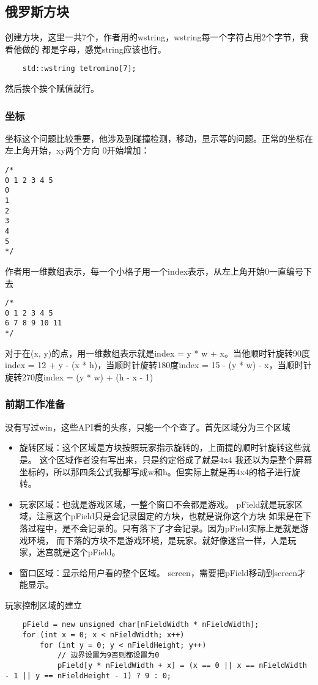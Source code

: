 \documentclass{article}
\begin{document}
\begin{sloppypar}
\subsection{俄罗斯方块}
创建方块，这里一共7个，作者用的wstring，wstring每一个字符占用2个字节，我看他做的
都是字母，感觉string应该也行。
\begin{lstlisting}
	std::wstring tetromino[7];
\end{lstlisting}
然后挨个挨个赋值就行。

\subsubsection{坐标}
坐标这个问题比较重要，他涉及到碰撞检测，移动，显示等的问题。正常的坐标在左上角开始，xy两个方向
0开始增加：
\begin{lstlisting}
/*
0 1 2 3 4 5
0
1
2
3
4
5
*/
\end{lstlisting}
作者用一维数组表示，每一个小格子用一个index表示，从左上角开始0一直编号下去
\begin{lstlisting}
/*
0 1 2 3 4 5
6 7 8 9 10 11
*/
\end{lstlisting}
对于在(x, y)的点，用一维数组表示就是index = y * w + x。当他顺时针旋转90度
index = 12 + y - (x * h)，当顺时针旋转180度index = 15 - (y * w) - x，当顺时针
旋转270度index = (y * w) + (h - x - 1)

\subsubsection{前期工作准备}
没有写过win，这些API看的头疼，只能一个个查了。首先区域分为三个区域
\begin{itemize}
	\item 旋转区域：这个区域是方块按照玩家指示旋转的，上面提的顺时针旋转这些就是。
	   \subitem 这个区域作者没有写出来，只是约定俗成了就是4x4
	我还以为是整个屏幕坐标的，所以那四条公式我都写成w和h。但实际上就是再4x4的格子进行旋转。
	\item 玩家区域：也就是游戏区域，一整个窗口不会都是游戏。
	   \subitem pField就是玩家区域，注意这个pField只是会记录固定的方块，也就是说你这个方块
	   如果是在下落过程中，是不会记录的。只有落下了才会记录。因为pField实际上是就是游戏环境，
	   而下落的方块不是游戏环境，是玩家。就好像迷宫一样，人是玩家，迷宫就是这个pField。
	\item 窗口区域：显示给用户看的整个区域。
	   \subitem screen，需要把pField移动到screen才能显示。
\end{itemize}
玩家控制区域的建立
\begin{lstlisting}
	pField = new unsigned char[nFieldWidth * nFieldWidth];
    for (int x = 0; x < nFieldWidth; x++)
        for (int y = 0; y < nFieldHeight; y++)
            // 边界设置为9否则都设置为0
            pField[y * nFieldWidth + x] = (x == 0 || x == nFieldWidth - 1 || y == nFieldHeight - 1) ? 9 : 0;
    

\end{lstlisting}
\end{sloppypar}
\end{document}
